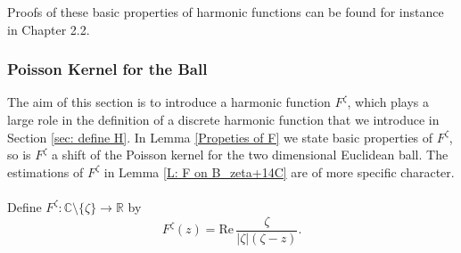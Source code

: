\documentclass[11pt]{article}
\numberwithin{equation}{section}
\begin{document}
Proofs of these basic properties of harmonic 
functions can be found for instance in \cite{evans} Chapter 2.2.


\subsubsection{Poisson Kernel for the Ball}
The aim of this section is to introduce a 
harmonic function $F^{\zeta}$, which   
plays a large role in the definition of a discrete harmonic function 
that we introduce in Section \ref{sec: define H}. 
In Lemma \ref{Propeties of F} we state basic properties
of $F^{\zeta}$, so is $F^{\zeta}$ a shift of the Poisson kernel 
for the two dimensional Euclidean ball. 
The estimations of $F^{\zeta}$ in Lemma \ref{L: F on B_zeta+14C} 
are of more specific character.\\~\\
Define $F^{\zeta} : \mathbb{C} \setminus \{\zeta\} \rightarrow \mathbb{R}$ by 
\begin{equation}  
  \label{D: def F^zeta}
  F^{\zeta} (z) = \text{Re}\, \frac{\zeta}{|\zeta| (\zeta - z)}.
\end{equation}
\end{document}
